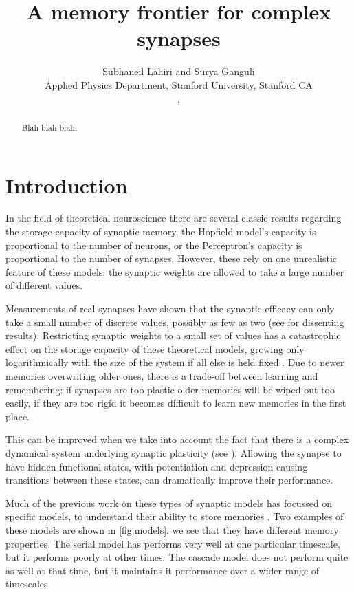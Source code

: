 \documentclass{article} %
\title{A memory frontier for complex synapses}
\author{Subhaneil Lahiri and Surya Ganguli\\
Applied Physics Department, Stanford University, Stanford CA\\
\emaillink{sulahiri@stanford.edu}, \emaillink{sulahiri@stanford.edu}
%
}
\begin{document}
\maketitle




\begin{abstract}
  Blah blah blah.
\end{abstract}



\section{Introduction}\label{sec:intro}

In the field of theoretical neuroscience there are several classic results regarding the storage capacity of synaptic memory, \eg the Hopfield model's capacity is proportional to the number of neurons, or the Perceptron's capacity is proportional to the number of synapses.
However, these rely on one unrealistic feature of these models: the synaptic weights are allowed to take a large number of different values.

Measurements of real synapses have shown that the synaptic efficacy can only take a small number of discrete values, possibly as few as two \cite{Bliss1993LTP,Petersen1998allornone,O'Connor2005switch} (see \cite{Enoki2009graded} for dissenting results).
Restricting synaptic weights to a small set of values has a catastrophic effect on the storage capacity of these theoretical models, growing only logarithmically with the size of the system if all else is held fixed \cite{amit1992constraints,amit1994learning}.
Due to newer memories overwriting older ones, there is a trade-off between learning and remembering: if synapses are too plastic older memories will be wiped out too easily, if they are too rigid it becomes difficult to learn new memories in the first place.

This can be improved when we take into account the fact that there is a complex dynamical system underlying synaptic plasticity (\eg see \cite{Bliss1993LTP,Bredt2003AMPA,Coba2009phosphorylation}).
Allowing the synapse to have hidden functional states, with potentiation and depression causing transitions between these states, can dramatically improve their performance.

Much of the previous work on these types of synaptic models has focussed on specific models, to understand their ability to store memories \cite{Fusi2005cascade,Fusi2007multistate,Leibold2008serial}.
Two examples of these models are shown in \autoref{fig:models}.
we see that they have different memory properties.
The serial model has performs very well at one particular timescale, but it performs poorly at other times.
The cascade model does not perform quite as well at that time, but it maintains it performance over a wider range of timescales.
\end{document}
